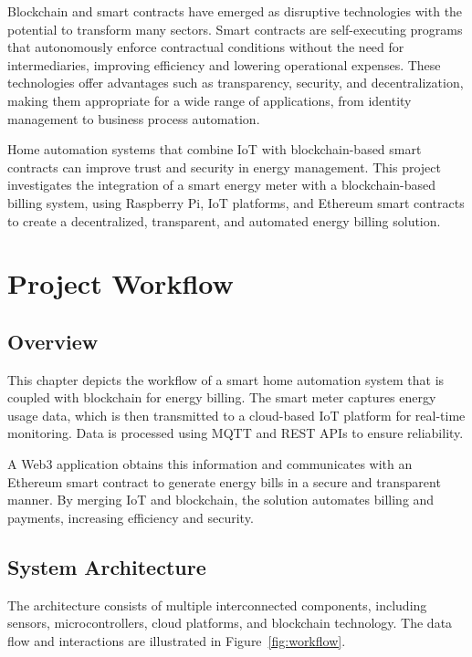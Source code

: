 \documentclass[a4paper,12pt]{report}
\begin{document}
Blockchain and smart contracts have emerged as disruptive technologies with the potential to transform many sectors.  Smart contracts are self-executing programs that autonomously enforce contractual conditions without the need for intermediaries, improving efficiency and lowering operational expenses\cite{10.1145/3328833.3328857}.  These technologies offer advantages such as transparency, security, and decentralization, making them appropriate for a wide range of applications, from identity management to business process automation\cite{chaudhari2017smart}.

 Home automation systems that combine IoT with blockchain-based smart contracts can improve trust and security in energy management.  This project investigates the integration of a smart energy meter with a blockchain-based billing system, using Raspberry Pi, IoT platforms, and Ethereum smart contracts to create a decentralized, transparent, and automated energy billing solution.


\chapter{Project Workflow}

\section{Overview}

This chapter depicts the workflow of a smart home automation system that is coupled with blockchain for energy billing.  The smart meter captures energy usage data, which is then transmitted to a cloud-based IoT platform for real-time monitoring\cite{jain2014raspberry}\cite{chaudhari2017smart}.  Data is processed using MQTT and REST APIs to ensure reliability\cite{Atmoko_2017}.

 A Web3 application obtains this information and communicates with an Ethereum smart contract to generate energy bills in a secure and transparent manner\cite{10.1145/3328833.3328857}\cite{Hu2018BlockchainbasedSC}.  By merging IoT and blockchain, the solution automates billing and payments, increasing efficiency and security.


\section{System Architecture}

The architecture consists of multiple interconnected components, including sensors, microcontrollers, cloud platforms, and blockchain technology. The data flow and interactions are illustrated in Figure~\ref{fig:workflow}.
\end{document}
